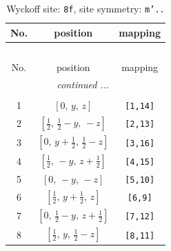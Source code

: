 \documentclass[fleqn,8pt]{jsarticle}
\begin{document}
\begin{longtable}{ccc}
\caption{Wyckoff site: {\tt 8f}, site symmetry: {\tt m'..}}
 \\
 \hline \hline
No. & position & mapping \\ \hline \endfirsthead

\multicolumn{2}{l}{\tablename\ \thetable{}} \\
 \hline \hline
No. & position & mapping \\ \hline \endhead

 \hline \hline
\multicolumn{2}{r}{\footnotesize\it continued ...} \\ \endfoot

 \hline \hline
\multicolumn{2}{r}{} \\ \endlastfoot

1 & $\left[ 0,\, y,\, z \right]$ & {\tt [1,14]} \\ \hline
2 & $\left[ \frac{1}{2},\, \frac{1}{2} - y,\, - z \right]$ & {\tt [2,13]} \\ \hline
3 & $\left[ 0,\, y + \frac{1}{2},\, \frac{1}{2} - z \right]$ & {\tt [3,16]} \\ \hline
4 & $\left[ \frac{1}{2},\, - y,\, z + \frac{1}{2} \right]$ & {\tt [4,15]} \\ \hline
5 & $\left[ 0,\, - y,\, - z \right]$ & {\tt [5,10]} \\ \hline
6 & $\left[ \frac{1}{2},\, y + \frac{1}{2},\, z \right]$ & {\tt [6,9]} \\ \hline
7 & $\left[ 0,\, \frac{1}{2} - y,\, z + \frac{1}{2} \right]$ & {\tt [7,12]} \\ \hline
8 & $\left[ \frac{1}{2},\, y,\, \frac{1}{2} - z \right]$ & {\tt [8,11]} \\
\end{longtable}
\renewcommand{\arraystretch}{1.2}
\end{document}
